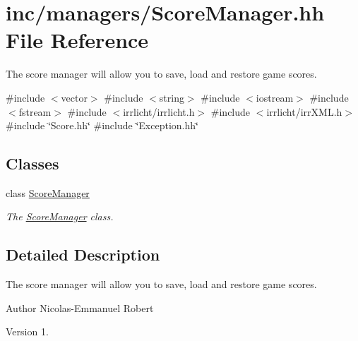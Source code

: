 \hypertarget{ScoreManager_8hh}{}\section{inc/managers/\+Score\+Manager.hh File Reference}
\label{ScoreManager_8hh}


The score manager will allow you to save, load and restore game scores.  


{\ttfamily \#include $<$vector$>$}\newline
{\ttfamily \#include $<$string$>$}\newline
{\ttfamily \#include $<$iostream$>$}\newline
{\ttfamily \#include $<$fstream$>$}\newline
{\ttfamily \#include $<$irrlicht/irrlicht.\+h$>$}\newline
{\ttfamily \#include $<$irrlicht/irr\+X\+M\+L.\+h$>$}\newline
{\ttfamily \#include \char`\"{}Score.\+hh\char`\"{}}\newline
{\ttfamily \#include \char`\"{}Exception.\+hh\char`\"{}}\newline
\subsection*{Classes}
\begin{DoxyCompactItemize}
\item 
class \hyperlink{classScoreManager}{Score\+Manager}
\begin{DoxyCompactList}\small\item\em The \hyperlink{classScoreManager}{Score\+Manager} class. \end{DoxyCompactList}\end{DoxyCompactItemize}


\subsection{Detailed Description}
The score manager will allow you to save, load and restore game scores. 

\begin{DoxyAuthor}{Author}
Nicolas-\/\+Emmanuel Robert 
\end{DoxyAuthor}
\begin{DoxyVersion}{Version}
1. 
\end{DoxyVersion}
